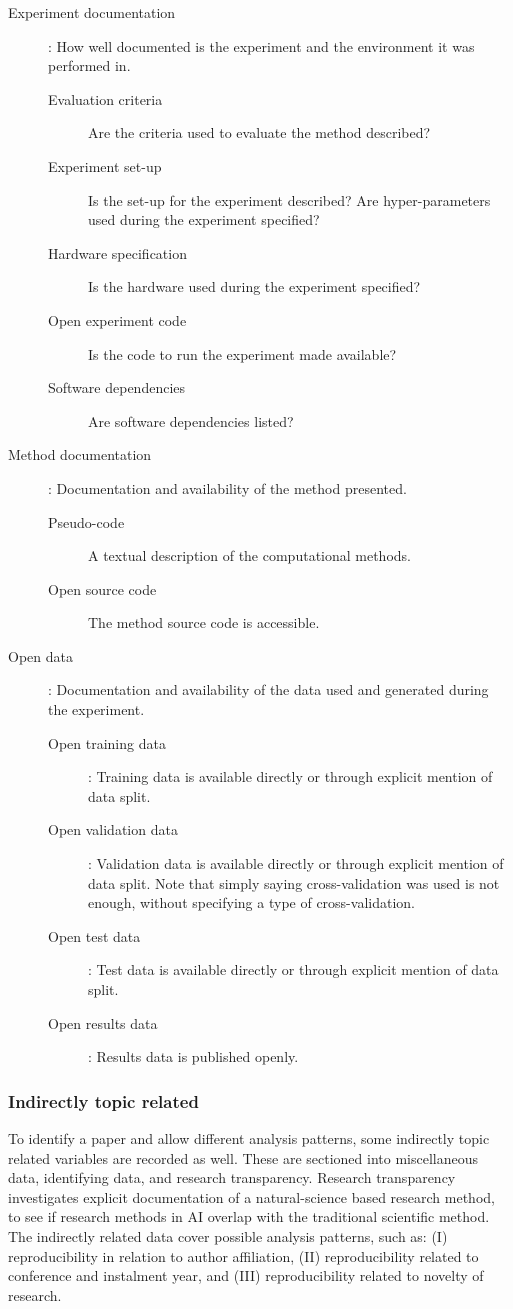 \begin{description}
\item[Experiment documentation]: How well documented is the experiment and the environment it was performed in.
    \begin{description}
    \item[Evaluation criteria] Are the criteria used to evaluate the method described?
    \item[Experiment set-up] Is the set-up for the experiment described? Are hyper-parameters used during the experiment specified?
    \item[Hardware specification] Is the hardware used during the experiment specified?
    \item[Open experiment code] Is the code to run the experiment made available?
    \item[Software dependencies] Are software dependencies listed?
    \end{description}
\item[Method documentation]: Documentation and availability of the method presented.
    \begin{description}
    \item[Pseudo-code] A textual description of the computational methods.
    \item[Open source code] The method source code is accessible.
    \end{description}
\item[Open data]: Documentation and availability of the data used and generated during the experiment.
    \begin{description}
    \item[Open training data]: Training data is available directly or through explicit mention of data split.
    \item[Open validation data]: Validation data is available directly or through explicit mention of data split. Note that simply saying cross-validation was used is not enough, without specifying a type of cross-validation.
    \item[Open test data]: Test data is available directly or through explicit mention of data split.
    \item[Open results data]: Results data is published openly.
    \end{description}
\end{description}

\subsubsection{Indirectly topic related}
To identify a paper and allow different analysis patterns, some indirectly topic related variables are recorded as well. These are sectioned into miscellaneous data, identifying data, and research transparency. Research transparency investigates explicit documentation of a natural-science based research method, to see if research methods in AI overlap with the traditional scientific method. The indirectly related data cover possible analysis patterns, such as: (I) reproducibility in relation to author affiliation, (II) reproducibility related to conference and instalment year, and (III) reproducibility related to novelty of research.

